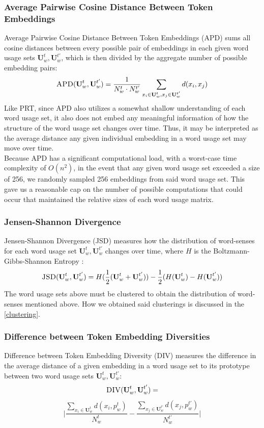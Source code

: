 \documentclass[10pt, a4paper]{article}
\begin{document}
\subsubsection{Average Pairwise Cosine Distance Between Token Embeddings}
Average Pairwise Cosine Distance Between Token Embeddings (APD) sums all cosine distances between every possible pair of embeddings in each given word usage sets $\textbf{U}^{t}_w, \textbf{U}^{t'}_w$, which is then divided by the aggregate number of possible embedding pairs:
$$\textsc{APD}(\textbf{U}^{t}_w, \textbf{U}^{t'}_w) = \frac{1}{N^{t}_w \cdot N^{t'}_w} \sum_{x_i \in \textbf{U}^{t}_w, x_j \in \textbf{U}^{t'}_w} d(x_i, x_j)$$
Like PRT, since APD also utilizes a somewhat shallow understanding of each word usage set, it also does not embed any meaningful information of how the structure of the word usage set changes over time. Thus, it may be interpreted as the average distance any given individual embedding in a word usage set may move over time.\\

Because APD has a significant computational load, with a worst-case time complexity of $O(n^2)$, in the event that any given word usage set exceeded a size of 256, we randomly sampled 256 embeddings from said word usage set. This gave us a reasonable cap on the number of possible computations that could occur that maintained the relative sizes of each word usage matrix. %

\subsubsection{Jensen-Shannon Divergence}
\label{JSD}
Jensen-Shannon Divergence (JSD) measures how the distribution of word-senses for each word usage set $\textbf{U}^{t}_w, \textbf{U}^{t'}_w$ changes over time, where $H$ is the Boltzmann-Gibbs-Shannon Entropy \cite{jensenshannon}:
\small $$\textsc{JSD}(\textbf{U}^{t}_w, \textbf{U}^{t'}_w) = H(\frac{1}{2}(\textbf{U}^{t}_w + \textbf{U}^{t'}_w)) - \frac{1}{2}(H(\textbf{U}^{t}_w) - H(\textbf{U}^{t'}_w))$$
The word usage sets above must be clustered to obtain the distribution of word-senses mentioned above. How we obtained said clusterings is discussed in the \ref{clustering}.
\subsubsection{Difference between Token Embedding Diversities}
Difference between Token Embedding Diversity (DIV) measures the difference in the average distance of a given embedding in a word usage set to its prototype between two word usage sets $\textbf{U}^{t}_w, \textbf{U}^{t'}_w$:
$$\textsc{DIV}(\textbf{U}^{t}_w, \textbf{U}^{t'}_w) = $$ 
$$\Bigg | \frac{\sum_{x_i \in \textbf{U}^{t}_w} d(x_i, p^{t}_w)}{N^{t}_w} - \frac{\sum_{x_j \in \textbf{U}^{t'}_w} d(x_j, p^{t'}_w)}{N^{t'}_w} \Bigg |$$
\end{document}
